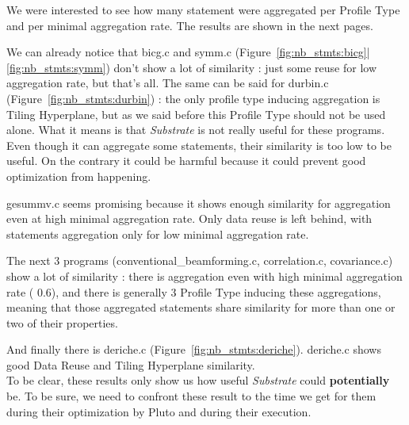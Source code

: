 \documentclass[paper=a4, fontsize=11.5pt]{scrartcl}
\numberwithin{equation}{section}        %
\numberwithin{figure}{section}          %
\numberwithin{table}{section}               %
\begin{document}
We were interested to see how many statement were aggregated per Profile Type and per minimal
aggregation rate. The results are shown in the next pages.

We can already notice that bicg.c and symm.c (Figure~\ref{fig:nb_stmts:bicg}|\ref{fig:nb_stmts:symm})
don't show a lot of similarity : just some reuse for low aggregation rate, but that's all.
The same can be said for durbin.c (Figure~\ref{fig:nb_stmts:durbin}) : the only profile type
inducing aggregation is Tiling Hyperplane, but as we said before this Profile Type should not
be used alone.
What it means is that \textit{Substrate} is not really useful for these programs. Even though
it can aggregate some statements, their similarity is too low to be useful. On the contrary
it could be harmful because it could prevent good optimization from happening.

gesummv.c seems promising because it shows enough similarity for aggregation even at high
minimal aggregation rate. Only data reuse is left behind, with statements aggregation only
for low minimal aggregation rate.

The next 3 programs (conventional\_beamforming.c, correlation.c, covariance.c) show a lot of
similarity : there is aggregation even with high minimal aggregation rate ( 0.6), and
there is generally 3 Profile Type inducing these aggregations, meaning that those aggregated 
statements share similarity for more than one or two of their properties.

And finally there is deriche.c (Figure~\ref{fig:nb_stmts:deriche}). deriche.c shows good
Data Reuse and Tiling Hyperplane similarity.\\

To be clear, these results only show us how useful \textit{Substrate} could \textbf{potentially} be.
To be sure, we need to confront these result to the time we get for them during their optimization by Pluto
and during their execution.
\end{document}
